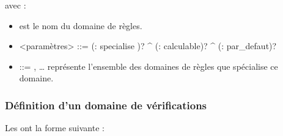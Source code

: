 \documentclass[letterpaper,10pt,french]{sphinxmanual}
\begin{document}
\begin{sphinxVerbatim}[commandchars=\\\{\}]
    
\end{sphinxVerbatim}

\sphinxAtStartPar
avec :
\begin{itemize}
\item {} 
\sphinxAtStartPar
{} est le nom du domaine de règles.

\item {} 
\sphinxAtStartPar
\textasciigrave{}\textless{}paramètres\textgreater{} ::= (: specialise )? \textasciicircum{} (: calculable)? \textasciicircum{} (: par\_defaut)?

\item {} 
\sphinxAtStartPar
 ::=  , …\textasciigrave{} représente l’ensemble des domaines de règles que spécialise ce domaine.

\end{itemize}


\subsubsection{Définition d’un domaine de vérifications}
\label{\detokenize{syntax:definition-d-un-domaine-de-verifications}}
\sphinxAtStartPar
Les  ont la forme suivante :

\begin{sphinxVerbatim}[commandchars=\\\{\}]
    
\end{sphinxVerbatim}
\end{document}
